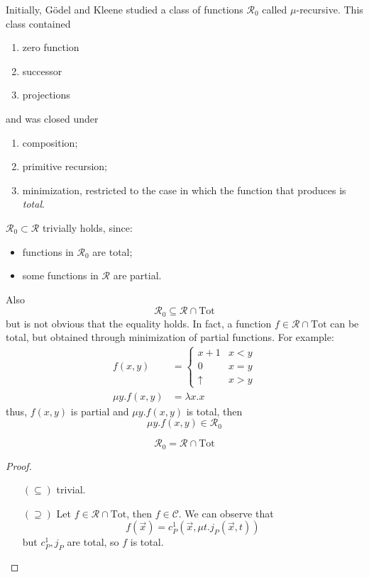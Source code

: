 \begin{observation}
Initially, Gödel and Kleene studied a class
of functions $\mathcal{R}_0$ called $\mu$-recursive. This class
contained
\begin{enumerate}[label=\alph*]
\item zero function
\item successor
\item projections
\end{enumerate}
and was closed under
\begin{enumerate}
\item composition;
\item primitive recursion;
\item minimization, restricted to the case in which the function that
  produces is \emph{total}.
\end{enumerate}
$\mathcal{R}_0 \subset \mathcal{R}$ trivially holds, since:
\begin{itemize}
\item functions in $\mathcal{R}_0$ are total;
\item some functions in $\mathcal{R}$ are partial.
\end{itemize}

Also \[\mathcal{R}_0 \subseteq \mathcal{R} \cap \text{Tot}\] but is
not obvious that the equality holds. In fact, a function
$f \in \mathcal{R} \cap \text{Tot}$ can be total, but obtained through
minimization of partial functions. For example:
\begin{align*}
  f(x,y) &= \begin{cases}
    x+1 & x<y \\
    0 & x=y \\
    \uparrow & x>y
  \end{cases} \\
  \mu y . f(x,y) &= \lambda x . x
\end{align*}
thus, $f(x,y)$ is partial and
$\mu y . f(x,y)$ is total, then \[\mu y . f(x,y) \in \mathcal{R}_0\]
\begin{theorem}
  \[\mathcal{R}_0 = \mathcal{R}\cap \text{Tot}\]
  \begin{proof}
    \begin{enumerate}
    \item[$(\subseteq)$] trivial.
    \item[$(\supseteq)$] Let $f \in \mathcal{R} \cap \text{Tot}$, then
      $f \in \mathcal{C}$.
      We can observe that
      \[f(\vec{x}) = c_P^1 ( \vec{x} , \mu t . j_P(\vec{x}, t))\]
      but $c_P^1, j_P$ are total, so $f$ is total.
    \end{enumerate}
  \end{proof}
\end{theorem}
\end{observation}
